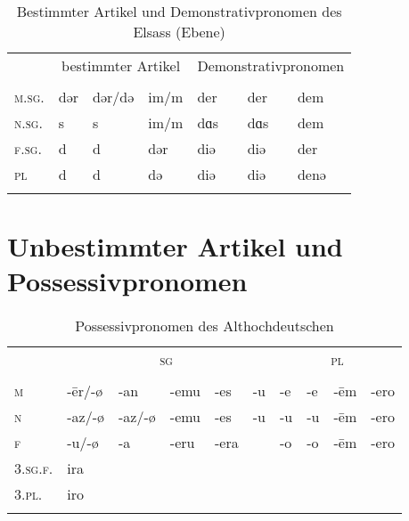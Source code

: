 \begin{table}[H]
	\caption{Bestimmter Artikel und Demonstrativpronomen des Elsass (Ebene) \citep[72-78, 84-88]{Beyer1963}}\label{table100}
	\begin{tabular}{lllllll}
		\lsptoprule
		& \multicolumn{3}{c}{bestimmter Artikel} & \multicolumn{3}{c}{Demonstrativpronomen} \\\cmidrule(lr){2-4}\cmidrule(lr){5-7}
		& \NOM & \AKK & \DAT & \NOM & \AKK & \DAT\\\midrule
		\textsc{m.sg.} & dər & dər/də & im/m & der & der & dem\\
		\textsc{n.sg.} & s & s & im/m & dɑs & dɑs & dem\\
		\textsc{f.sg.} & d & d & dər & diǝ & diǝ & der\\
		\textsc{pl} & d & d & də & diǝ & diǝ & denə\\
		\lspbottomrule
	\end{tabular}

\end{table}

\section{Unbestimmter Artikel und Possessivpronomen}


\begin{table}[H]
	\caption{Possessivpronomen des Althochdeutschen \citep[245-246]{Braune2004}}\label{table101}
	\begin{tabular}{llllllllll}
		\lsptoprule
		& \multicolumn{5}{c}{\textsc{sg}}  & \multicolumn{4}{c}{\textsc{pl}} \\\cmidrule(lr){2-6}\cmidrule(lr){7-10}
		& \NOM & \AKK & \DAT & \GEN & \INSTR & \NOM & \AKK & \DAT & \GEN\\\midrule
		\textsc{m} & \mbox{{}-\=er/-ø} & {}-an & {}-emu & {}-es & {}-u & {}-e & {}-e & {}-\=em & {}-ero\\
		\textsc{n} & \mbox{{}-az/-ø} & \mbox{{}-az/-ø} & {}-emu & {}-es & {}-u & {}-u & {}-u & {}-\=em & {}-ero\\
		\textsc{f} & {}-u/-ø & {}-a & {}-eru & {}-era &  & {}-o & {}-o & {}-\=em & {}-ero\\
		\midrule
		\textsc{3.sg.f.} & ira &  &  &  &  &  &  &  & \\
		\textsc{3.pl.} & iro &  &  &  &  &  &  &  & \\
		\lspbottomrule
	\end{tabular}
\end{table}

